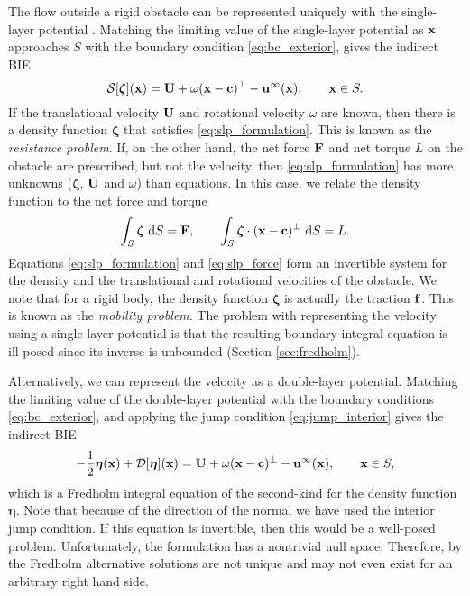 The flow outside a rigid obstacle can be represented uniquely with the single-layer potential \cite{Pozrikidis1992}. Matching the limiting value of the single-layer potential as ${\mathbf{x}}$ approaches $S$ with the boundary condition \eqref{eq:bc_exterior}, gives the indirect BIE
\begin{equation}\label{eq:slp_formulation} \mathcal{S}[\bm{\zeta}]({\mathbf{x}})  = {\mathbf{U}} + \omega({\mathbf{x}} - {\mathbf{c}})^\perp -{\mathbf{u}}^{\infty}({\mathbf{x}}), \qquad {\mathbf{x}}\in S.\end{equation}
If the translational velocity ${\mathbf{U}}$ and rotational velocity $\omega$ are known, then there is a density function $\bm{\zeta}$ that satisfies \eqref{eq:slp_formulation}. This is known as the \emph{resistance problem}. If, on the other hand, the net force ${\mathbf{F}}$ and net torque $L$ on the obstacle are prescribed, but not the velocity, then \eqref{eq:slp_formulation} has more unknowns ($\bm{\zeta}$, ${\mathbf{U}}$ and $\omega$) than equations. In this case, we relate the density function to the net force and torque
\begin{equation}\label{eq:slp_force} \int_S \bm{\zeta}~\text{d}S = {\mathbf{F}}, \qquad \int_S \bm{\zeta}\cdot({\mathbf{x}} - {\mathbf{c}})^\perp~\text{d}S = L.\end{equation}
Equations \eqref{eq:slp_formulation} and \eqref{eq:slp_force} form an invertible system for the density and the translational and rotational velocities of the obstacle. We note that for a rigid body, the density function $\bm{\zeta}$ is actually the traction ${\mathbf{f}}$. This is known as the \emph{mobility problem}. The problem with representing the velocity using a single-layer potential is that the resulting boundary integral equation is ill-posed since its inverse is unbounded (Section \ref{sec:fredholm}). 

Alternatively, we can represent the velocity as a double-layer potential. Matching the limiting value of the double-layer potential with the boundary conditions \eqref{eq:bc_exterior}, and applying the jump condition \eqref{eq:jump_interior} gives the indirect BIE
\begin{equation}\label{eq:dlp_incomplete}-\frac{1}{2}\bm{\eta}({\mathbf{x}}) + \mathcal{D}[\bm{\eta}]({\mathbf{x}}) = {\mathbf{U}} + \omega({\mathbf{x}} - {\mathbf{c}})^\perp - {\mathbf{u}}^{\infty}({\mathbf{x}}),\qquad {\mathbf{x}}\in S,\end{equation}
 which is a Fredholm integral equation of the second-kind for the density function $\bm{\eta}$. Note that because of the direction of the normal we have used the interior jump condition. If this equation is invertible, then this would be a well-posed problem. Unfortunately, the formulation has a nontrivial null space. Therefore, by the Fredholm alternative solutions are not unique and may not even exist for an arbitrary right hand side. 
 
